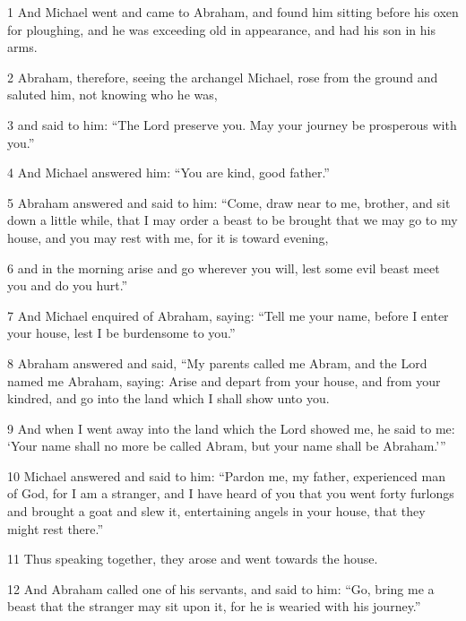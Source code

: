 \par 1 And Michael went and came to Abraham, and found him sitting before his oxen for ploughing, and he was exceeding old in appearance, and had his son in his arms. 

\par 2 Abraham, therefore, seeing the archangel Michael, rose from the ground and saluted him, not knowing who he was, 

\par 3 and said to him: “The Lord preserve you. May your journey be prosperous with you.” 

\par 4 And Michael answered him: “You are kind, good father.” 

\par 5 Abraham answered and said to him: “Come, draw near to me, brother, and sit down a little while, that I may order a beast to be brought that we may go to my house, and you may rest with me, for it is toward evening, 

\par 6 and in the morning arise and go wherever you will, lest some evil beast meet you and do you hurt.” 

\par 7 And Michael enquired of Abraham, saying: “Tell me your name, before I enter your house, lest I be burdensome to you.” 

\par 8 Abraham answered and said, “My parents called me Abram, and the Lord named me Abraham, saying: Arise and depart from your house, and from your kindred, and go into the land which I shall show unto you. 

\par 9 And when I went away into the land which the Lord showed me, he said to me: ‘Your name shall no more be called Abram, but your name shall be Abraham.’” 

\par 10 Michael answered and said to him: “Pardon me, my father, experienced man of God, for I am a stranger, and I have heard of you that you went forty furlongs and brought a goat and slew it, entertaining angels in your house, that they might rest there.” 

\par 11 Thus speaking together, they arose and went towards the house. 

\par 12 And Abraham called one of his servants, and said to him: “Go, bring me a beast that the stranger may sit upon it, for he is wearied with his journey.” 

